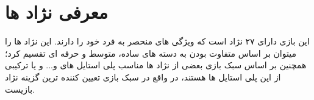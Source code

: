 \chapter{معرفی نژاد ها}
این بازی دارای ۲۷ نژاد است که ویژگی های منحصر به فرد خود را دارند.
این نژاد ها را میتوان بر اساس متفاوت بودن به دسته های ساده، متوسط و حرفه ای تقسیم کرد؛ همچنین بر اساس سبک بازی بعضی از نژاد ها مناسب پلی استایل های  و... و یا ترکیبی از این پلی استایل ها هستند، در واقع در سبک بازی تعیین کننده ترین گزینه نژاد بازیست.
